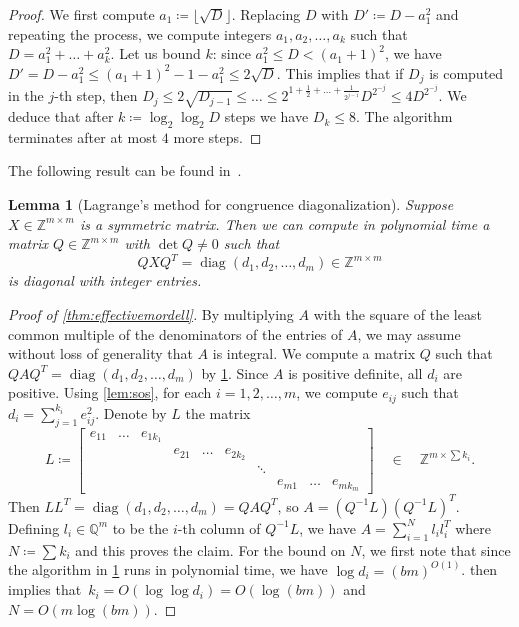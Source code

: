 \documentclass[10pt,a4paper]{article}
\newtheorem{lemma}[theorem]{Lemma}
\theoremstyle{definition}
\DeclareMathOperator{\poly}{poly}
\DeclareMathOperator{\diag}{diag}
\newcommand{\QQ}{\mathbb{Q}}
\newcommand{\ZZ}{\mathbb{Z}}
\numberwithin{equation}{section}
\begin{document}
\begin{proof}
We first compute %
$a_1\coloneqq\lfloor\sqrt{D}\rfloor$.
Replacing $D$ with $D'\coloneqq D-a_1^2$ and repeating the process,
we compute integers $a_1,a_2,\dots,a_k$ such that
$D=a_1^2+\dots+a_k^2$. Let us bound $k$:
since $a_1^2 \leq D < (a_1+1)^2$, we have $D'=D-a_1^2 \leq (a_1+1)^2-1 -a_1^2 \leq 2 \sqrt{D}$.
This implies that if $D_j$ is computed in the $j$-th step, then
$D_j \leq 2\sqrt{D_{j-1}}\leq\dots\leq 2^{1+\frac{1}{2}+\dots+\frac{1}{2^{j-1}}}D^{2^{-j}}\leq 4 D^{2^{-j}}$.
We deduce that after $k\coloneqq\log_2\log_2 D$ steps we have $D_{k}\leq 8$.
The algorithm terminates after at most $4$ more steps.
\end{proof}

The following result can be found in~\cite[Algorithm~12.1]{schaum-lin-alg}.

\begin{lemma}[Lagrange's method for congruence diagonalization]\label{lem:lagrange-method}
Suppose $X\in\ZZ^{m\times m}$ is a symmetric matrix.
Then %
we can compute  in polynomial time
a matrix $Q\in\ZZ^{m\times m}$ with $\det Q\neq 0$ such that
\[
	Q X Q^T = \diag(d_1,d_2,\dots,d_m)\in\ZZ^{m\times m}
\] is diagonal with integer entries.
\end{lemma}

\begin{proof}[Proof of \cref{thm:effectivemordell}]
By multiplying $A$ with the square of the least common multiple of the denominators of the entries of $A$, we may assume without loss of generality that $A$ is integral. We compute a matrix $Q$ such that $QAQ^T = \diag(d_1,d_2,\dots,d_m)$
by \cref{lem:lagrange-method}.
Since $A$ is positive definite, all $d_i$ are positive.
Using \cref{lem:sos}, for each $i=1,2,\dots,m$,
we compute $e_{ij}$ such that $d_i = \sum_{j=1}^{k_i} e_{ij}^2$.
Denote by $L$ the matrix
\[
L \coloneqq \begin{bmatrix}
e_{11} & \dots & e_{1 k_1} &          &         &          &    & & &   \\
       &       &           & e_{21}   & \dots   & e_{2k_2} &    & & & \\
  	   &       &           &          &         &          &\ddots & & &\\
       &       &           &          &         &          &       & e_{m1}& \dots & e_{mk_m}
	\end{bmatrix}\quad\in\quad \ZZ^{m\times \sum k_i}.
\]
Then $LL^T=\diag(d_1,d_2,\dots,d_m)=QAQ^T$, so $A = (Q^{-1}L) (Q^{-1}L)^{T}$.
Defining $l_i\in\QQ^m$ to be the $i$-th column of $Q^{-1}L$,
we have $A=\sum_{i=1}^N l_i l_i^T$ where $N\coloneqq \sum k_i$ and this proves the claim. For the bound on $N$,
we first note that since the algorithm in \cref{lem:lagrange-method} runs in polynomial time,
we have %
$\log d_i = (bm)^{O(1)}$.
 then implies that~$k_i = O(\log\log d_i) = O(\log(bm))$ and~$N = O(m\log(bm))$.
\end{proof}
\end{document}
